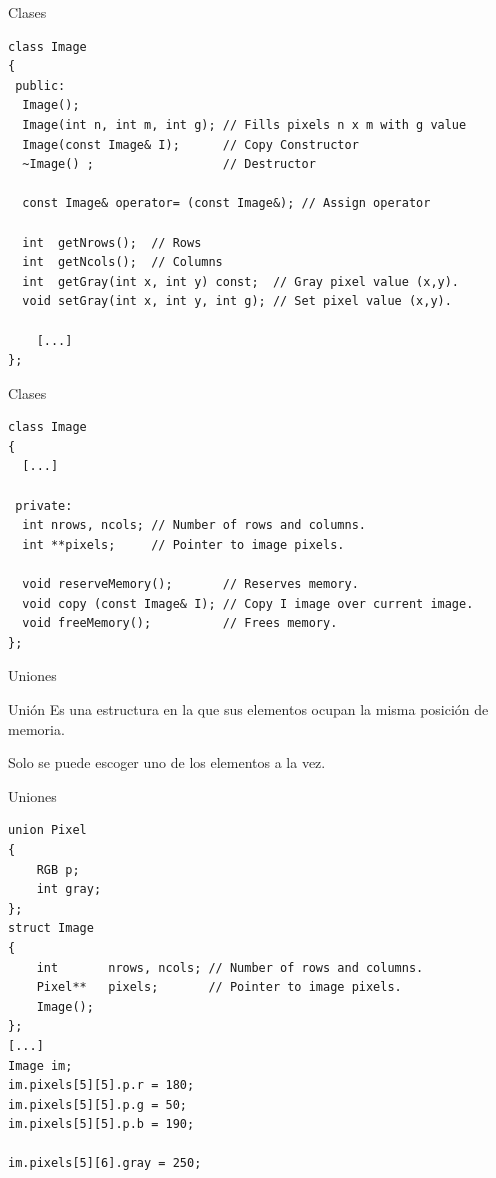 \documentclass[aspectratio=169,presentation]{beamer}
\begin{document}
\begin{frame}[label={sec:orga9cfb8d},fragile]{Clases}
 \begin{verbatim}
class Image
{
 public:
  Image();
  Image(int n, int m, int g); // Fills pixels n x m with g value
  Image(const Image& I);      // Copy Constructor
  ~Image() ;                  // Destructor

  const Image& operator= (const Image&); // Assign operator

  int  getNrows();  // Rows
  int  getNcols();  // Columns
  int  getGray(int x, int y) const;  // Gray pixel value (x,y).
  void setGray(int x, int y, int g); // Set pixel value (x,y).

	[...]
};
\end{verbatim}
\end{frame}
\begin{frame}[label={sec:org8ad4073},fragile]{Clases}
 \begin{verbatim}
class Image
{
  [...]

 private:
  int nrows, ncols; // Number of rows and columns.
  int **pixels;     // Pointer to image pixels.

  void reserveMemory();       // Reserves memory.
  void copy (const Image& I); // Copy I image over current image.
  void freeMemory();          // Frees memory.
};
\end{verbatim}
\end{frame}
\begin{frame}[label={sec:orge188c51},fragile]{Uniones}
 \begin{block}{Unión}
Es una estructura en la que sus elementos ocupan la misma posición de memoria.

Solo se puede escoger uno de los elementos a la vez.
\end{block}
\end{frame}
\begin{frame}[label={sec:org8d77246},fragile]{Uniones}
 \begin{verbatim}
union Pixel
{
	RGB p;
	int gray;
};
struct Image
{
	int       nrows, ncols; // Number of rows and columns.
	Pixel**   pixels;       // Pointer to image pixels.
	Image();
};
[...]
Image im;
im.pixels[5][5].p.r = 180;
im.pixels[5][5].p.g = 50;
im.pixels[5][5].p.b = 190;
	
im.pixels[5][6].gray = 250;
\end{verbatim}
\end{frame}
\end{document}
